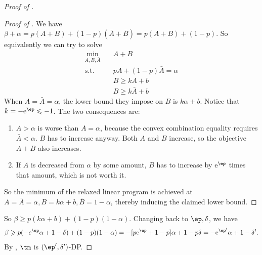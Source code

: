 \begin{proof}[Proof of ]
\begin{proof}[Proof of ]
		We have $\beta+\alpha = p(A+B)+(1-p)(\bar{A}+\bar{B})=p(A+B)+(1-p)$. So equivalently we can try to solve
		\begin{align*}
			\min_{A,B,\bar{A}} \quad & A+B\\
			\textrm{s.t.}\quad
			& pA+(1-p)\bar{A}=\alpha\\
			& B\geqslant kA+b\\
			& B\geqslant k\bar{A}+b
		\end{align*}
		When $A=\bar{A}=\alpha$, the lower bound they impose on $B$ is $k\alpha+b$. Notice that $k=-\e^\ep\leqslant -1$. The two consequences are:
		\begin{enumerate}
			\setlength\itemsep{-0.3em}
			\item $A>\alpha$ is worse than $A=\alpha$, because the convex combination equality requires $\bar{A}<\alpha$. $B$ has to increase anyway. Both $A$ and $B$ increase, so the objective $A+B$ also increases.
			\item If $A$ is decreased from $\alpha$ by some amount, $B$ has to increase by $\e^\ep$ times that amount, which is not worth it.
		\end{enumerate}
		So the minimum of the relaxed linear program is achieved at $A=\bar{A}=\alpha, B=k\alpha+b,\bar{B} = 1-\alpha$, thereby inducing the claimed lower bound.
	\end{proof}

	So $\beta\geqslant p(k\alpha+b)+(1-p)(1-\alpha)$. Changing back to $\ep,\delta$, we have
	\[\beta\geqslant p(-e^\ep\alpha+1-\delta)+(1-p)(1-\alpha) = -[p\e^\ep+1-p]\alpha+1-p\delta = -\e^{\ep'}\alpha+1-\delta'.\]
	By , $\tm$ is $(\ep',\delta')$-DP.
\end{proof}


